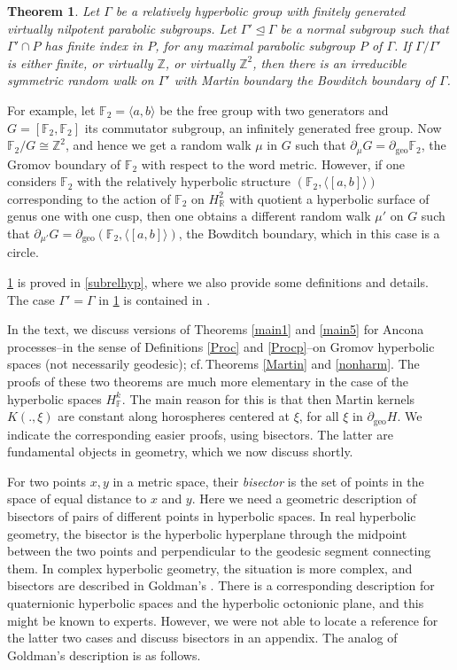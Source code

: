 \documentclass[12pt,a4paper]{amsart}
\newcounter{alph}
\newtheorem{theo}[alph]{Theorem}
\numberwithin{equation}{section}
\theoremstyle{definition}
\DeclareMathOperator{\geo}{geo}
\def\F{\mathbb F}
\def\R{\mathbb R}
\def\Z{\mathbb Z}
\def\la{\langle}
\def\ra{\rangle}
\begin{document}
\begin{theo}\label{bowbou}
Let $\Gamma$ be a relatively hyperbolic group  with finitely generated virtually nilpotent parabolic subgroups.
Let $\Gamma'\trianglelefteq \Gamma$ be a normal subgroup such that $\Gamma'\cap P$ has finite index in $P$, for any maximal parabolic subgroup $P$ of $\Gamma$.
If $\Gamma/\Gamma'$ is either finite, or virtually $\Z$, or virtually $\Z^2$, 
then there is an irreducible symmetric random walk on $\Gamma'$ with Martin boundary the Bowditch boundary of $\Gamma$.
\end{theo}

For example, let $\F_2=\la a,b\ra$ be the free group with two generators and $G=[\mathbb{F}_2,\mathbb{F}_2]$ its commutator subgroup, an infinitely generated free group.
Now $\F_2/G\cong\Z^2$, and hence we get a random walk $\mu$ in $G$ such that $\partial_\mu G=\partial_{\geo}\mathbb{F}_2$, the Gromov boundary of $\mathbb{F}_2$ with respect to the word metric.
However, if one considers $\F_2$ with the relatively hyperbolic structure $(\F_2,\la[a,b]\ra)$ corresponding to the action of $\F_2$ on $H_{\R}^2$ with quotient a hyperbolic surface of genus one with one cusp, then one obtains a different random walk $\mu'$ on $G$ such that $\partial_{\mu'}G=\partial_{\geo}(\F_2,\la[a,b]\ra)$, the Bowditch boundary, which in this case is a circle.

\cref{bowbou} is proved in \cref{subrelhyp}, where we also provide some definitions and details.
The case $\Gamma'=\Gamma$ in \cref{bowbou} is contained in \cite{Nan}.

In the text, we discuss versions of Theorems \ref{main1} and \ref{main5} for Ancona processes--in the sense of Definitions \ref{Proc} and \ref{Procp}--on Gromov hyperbolic spaces (not necessarily geodesic); cf.\,Theorems \ref{Martin} and \ref{nonharm}. 
The proofs of these two theorems are much more elementary in the case of the hyperbolic spaces $H_\F^k$.
The main reason for this is that then Martin kernels $K(.,\xi)$ are constant along horospheres centered at $\xi$,
for all $\xi$ in $\partial_{\geo}H$.
We indicate the corresponding easier proofs, using bisectors.
The latter are fundamental objects in geometry, which we now discuss shortly.

For two points $x,y$ in a metric space, their \emph{bisector} is the set of points in the space of equal distance to $x$ and $y$.
Here we need a geometric description of bisectors of pairs of different points in hyperbolic spaces.
In real hyperbolic geometry, the bisector is the hyperbolic hyperplane through the midpoint between the two points
and perpendicular to the geodesic segment connecting them.
In complex hyperbolic geometry, the situation is more complex, and bisectors are described in Goldman's \cite[Section 5]{Go}.
There is a corresponding description for quaternionic hyperbolic spaces and the hyperbolic octonionic plane,
and this might be known to experts.
However, we were not able to locate a reference for the latter two cases and discuss bisectors in an appendix.
The analog of Goldman's description is as follows.
\end{document}
